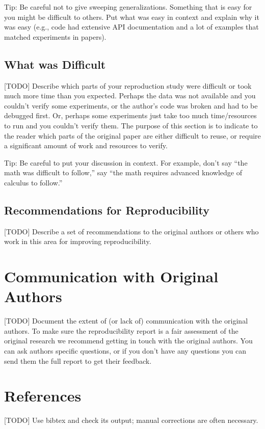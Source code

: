 \documentclass{article}
\begin{document}
Tip: Be careful not to give sweeping generalizations. Something that is easy for you might be difficult to others. Put what was easy in context and explain why it was easy (e.g., code had extensive API documentation and a lot of examples that matched experiments in papers). 

\subsection{What was Difficult}

[TODO] Describe which parts of your reproduction study were difficult or took much more time than you expected. Perhaps the data was not available and you couldn't verify some experiments, or the author's code was broken and had to be debugged first. Or, perhaps some experiments just take too much time/resources to run and you couldn't verify them. The purpose of this section is to indicate to the reader which parts of the original paper are either difficult to reuse, or require a significant amount of work and resources to verify. 

Tip: Be careful to put your discussion in context. For example, don't say ``the math was difficult to follow,'' say ``the math requires advanced knowledge of calculus to follow.'' 

\subsection{Recommendations for Reproducibility}

[TODO] Describe a set of recommendations to the original authors or others who work in this area for improving reproducibility.

\section*{Communication with Original Authors}

[TODO] Document the extent of (or lack of) communication with the original authors. To make sure the reproducibility report is a fair assessment of the original research we recommend getting in touch with the original authors. You can ask authors specific questions, or if you don't have any questions you can send them the full report to get their feedback.


\section*{References}

[TODO] Use bibtex and check its output; manual corrections are often necessary.
\end{document}
